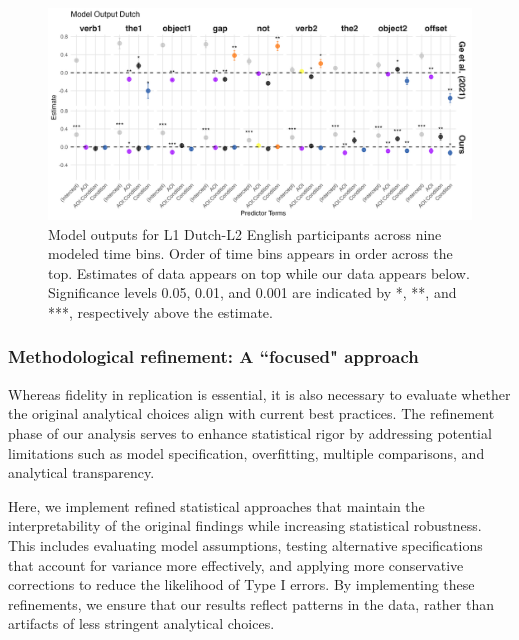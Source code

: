 \begin{figure}[H]  %
    \centering
    \includegraphics[width=\textwidth,height=\textheight,keepaspectratio]{viz/model_plot_dutch.png}
    \caption{Model outputs for L1 Dutch-L2 English participants across nine modeled time bins. Order of time bins appears in order across the top. Estimates of \cite{Ge2021} data appears on top while our data appears below. Significance levels 0.05, 0.01, and 0.001 are indicated by *, **, and ***, respectively above the estimate.}
    \label{fig:model_plot_dutch}
\end{figure}





\subsubsection{Methodological refinement: A ``focused" approach}

Whereas fidelity in replication is essential, it is also necessary to evaluate whether the original analytical choices align with current best practices. The refinement phase of our analysis serves to enhance statistical rigor by addressing potential limitations such as model specification, overfitting, multiple comparisons, and analytical transparency.

Here, we implement refined statistical approaches that maintain the interpretability of the original findings while increasing statistical robustness. This includes evaluating model assumptions, testing alternative specifications that account for variance more effectively, and applying more conservative corrections to reduce the likelihood of Type I errors. By implementing these refinements, we ensure that our results reflect patterns in the data, rather than artifacts of less stringent analytical choices.

